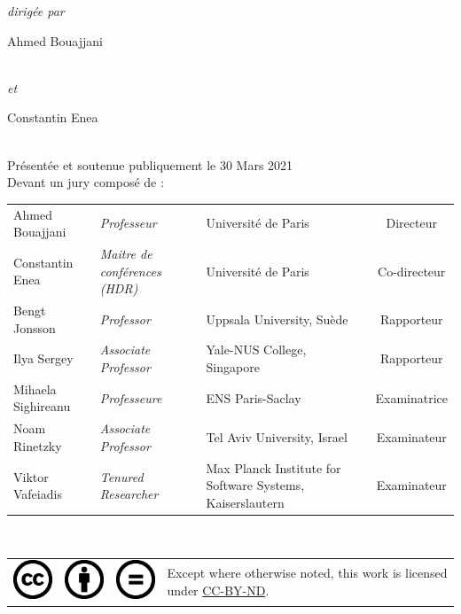 \begin{titlepage}
\begin{center}
    \vspace{0.7cm}
    \emph{dirigée par}\\
    \vspace{0.1cm}
    \begin{Large}Ahmed Bouajjani\end{Large}\\
    \emph{et}\\
    \begin{Large}Constantin Enea\end{Large}\\
    \vspace{0.5cm}
    Présentée et soutenue publiquement le 30 Mars 2021\\
    \vspace{0.1cm}
    Devant un jury composé de :\\
    \vspace{0.5cm}
    \begin{tabular}{lp{9em}p{12em}c}
    Ahmed Bouajjani & \emph{Professeur} & Université de Paris & Directeur\\
    Constantin Enea & \emph{Maitre de conférences (HDR)} & Université de Paris & Co-directeur\\
    Bengt Jonsson & \emph{Professor} & Uppsala University, Suède & Rapporteur\\
    Ilya Sergey & \emph{Associate Professor} & Yale-NUS College, Singapore & Rapporteur\\
    Mihaela Sighireanu & \emph{Professeure} & ENS Paris-Saclay & Examinatrice\\
    Noam Rinetzky & \emph{Associate Professor} & Tel Aviv University, Israel & Examinateur\\
    Viktor Vafeiadis & \emph{Tenured Researcher} & Max Planck Institute for Software Systems, Kaiserslautern & Examinateur\\
    \end{tabular}\\
    \vfill
    \begin{tabular}{cccb{12em}}
      \includegraphics[scale=.5]{assets/cc.png} & \includegraphics[scale=.5]{assets/by.png} & \includegraphics[scale=.5]{assets/nd.png} & Except where otherwise noted, this work is licensed under \href{https://creativecommons.org/licenses/by-nd/4.0}{CC-BY-ND}.\\
    \end{tabular}
  \end{center}
  \makeatother
\end{titlepage}
\newpage
\null
\thispagestyle{empty}
\newpage
